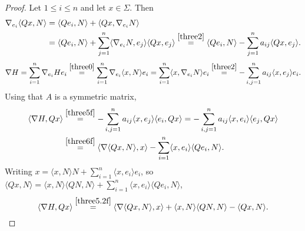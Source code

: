 \documentclass[12pt,reqno]{amsart}
\theoremstyle{definition}
\newcommand{\sdimn}{n}
\begin{document}
\begin{proof}
Let $1\leq i\leq \sdimn$ and let $x\in\Sigma$.  Then
\begin{equation}\label{three6f}
\begin{aligned}
\nabla_{e_{i}}\langle Qx,N\rangle
&=\langle Qe_{i},N\rangle+\langle Qx,\nabla_{e_{i}}N\rangle\\
&=\langle Qe_{i},N\rangle+\sum_{j=1}^{\sdimn}\langle\nabla_{e_{i}} N,e_{j}\rangle\langle Qx,e_{j}\rangle
\stackrel{\eqref{three2}}{=}\langle Qe_{i},N\rangle-\sum_{j=1}^{\sdimn}a_{ij}\langle Qx,e_{j}\rangle.
\end{aligned}
\end{equation}
\begin{equation}\label{three5f}
\nabla H
=\sum_{i=1}^{\sdimn}\nabla_{e_{i}}H e_{i}
\stackrel{\eqref{three0}}{=}\sum_{i=1}^{\sdimn}\nabla_{e_{i}}\langle x,N\rangle e_{i}
=\sum_{i=1}^{\sdimn}\langle x,\nabla_{e_{i}}N\rangle e_{i}\\
\stackrel{\eqref{three2}}{=}-\sum_{i,j=1}^{\sdimn}a_{ij}\langle x,e_{j}\rangle e_{i}.
\end{equation}
Using that $A$ is a symmetric matrix,
\begin{equation}\label{three5.2f}
\begin{aligned}
\langle\nabla H,Qx\rangle
&\stackrel{\eqref{three5f}}{=}-\sum_{i,j=1}^{\sdimn}a_{ij}\langle x,e_{j}\rangle \langle e_{i},Qx\rangle
=-\sum_{i,j=1}^{\sdimn}a_{ij}\langle x,e_{i}\rangle \langle e_{j},Qx\rangle\\
&\stackrel{\eqref{three6f}}{=}\langle\nabla\langle Qx,N\rangle,x\rangle-\sum_{i=1}^{\sdimn}\langle x,e_{i}\rangle\langle Qe_{i},N\rangle.
\end{aligned}
\end{equation}
Writing $x=\langle x,N\rangle N+\sum_{i=1}^{\sdimn}\langle x,e_{i}\rangle e_{i}$, so $\langle Qx,N\rangle=\langle x,N\rangle \langle QN,N\rangle+\sum_{i=1}^{\sdimn}\langle x,e_{i}\rangle \langle Qe_{i},N\rangle$,
\begin{equation}\label{three5.3f}
\langle\nabla H,Qx\rangle
\stackrel{\eqref{three5.2f}}{=}\langle\nabla\langle Qx,N\rangle,x\rangle+\langle x,N\rangle \langle QN,N\rangle-\langle Qx,N\rangle.
\end{equation}



\end{proof}
\end{document}
